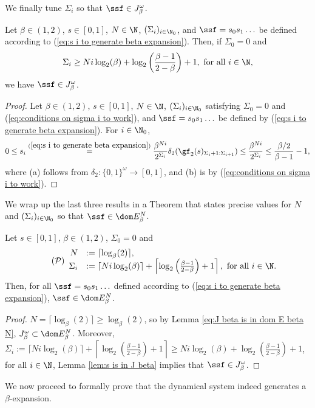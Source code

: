 \noindent We finally tune $\Sigma_i$ so that $\ssf \in J_\beta^\omega$.
\begin{lemma}\label{lem:s is in J beta}
	Let $\beta \in (1,2)$, $s \in [0,1]$, $N \in \N$, $(\Sigma_i)_{i \in \N_0}$, and $\ssf = s_0s_1\ldots$ be defined according to (\ref{eq:s i to generate beta expansion}). Then, if $\Sigma_0 = 0$ and
	\begin{equation}\label{eq:conditions on sigma i to work}
		\Sigma_i \geq Ni\log_2(\beta)+\log_2\left(\frac{\beta -1}{2 - \beta}\right) + 1, \ \text{for all} \ i \in \N,
	\end{equation}
	we have $\ssf \in J_\beta^\omega$.
\end{lemma}
\begin{proof}
	Let $\beta \in (1,2)$, $s \in [0,1]$, $N \in \N$, $(\Sigma_i)_{i \in \N_0}$ satisfying $\Sigma_0 = 0$ and (\ref{eq:conditions on sigma i to work}), and $\ssf = s_0s_1\ldots$ be defined by (\ref{eq:s i to generate beta expansion}). For $i \in \N_0$,
	\begin{equation}
		0 \leq s_i \overset{(\ref{eq:s i to generate beta expansion})}{=} \frac{\beta^{Ni}}{2^{\Sigma_i}} \delta_2(\gf_2(s)_{\Sigma_i+1:\Sigma_{i+1}}) \leq \frac{\beta^{Ni}}{2^{\Sigma_i}} \leq \frac{\beta/2}{\beta-1} - 1,
	\end{equation}
	where (a) follows from $\delta_2 : \{0,1\}^\omega \to [0,1]$, and (b) is by (\ref{eq:conditions on sigma i to work}).
\end{proof}
We wrap up the last three results in a Theorem that states precise values for $N$ and $(\Sigma_i)_{i \in \N_0}$ so that $\ssf \in \dom E_\beta^N$.
\begin{theorem}\label{thm:condition on the input sequences so that s is in dom E}
	Let $s \in [0,1]$, $\beta \in (1,2)$, $\Sigma_0 = 0$ and
	\begin{equation}\label{eq:final value parameters}\tag{\text{$\mathcal{P}$}}
		\begin{array}{rl}
			N &:= \lceil \log_\beta(2) \rceil,\\
			\Sigma_i &:= \lceil Ni\log_2(\beta)\rceil + \left\lceil \log_2\left(\frac{\beta -1}{2 - \beta}\right) + 1 \right\rceil, \ \text{for all} \ i \in \N.
		\end{array}
	\end{equation}
	Then, for all $\ssf = s_0s_1\ldots$ defined according to (\ref{eq:s i to generate beta expansion}), $\ssf \in \dom E_\beta^N$.
\end{theorem}
\begin{proof}
	$N = \lceil \log_\beta(2) \rceil \geq \log_\beta(2)$, so by Lemma \ref{eq:J beta is in dom E beta N}, $J_\beta^\omega \subset \dom E_\beta^N$. Moreover, $\Sigma_i := \lceil Ni\log_2(\beta)\rceil + \left\lceil \log_2\left(\frac{\beta -1}{2 - \beta}\right) + 1 \right\rceil \geq Ni\log_2(\beta)+\log_2\left(\frac{\beta -1}{2 - \beta}\right) + 1$, for all $i \in \N$, Lemma \ref{lem:s is in J beta} implies that $\ssf \in J_\beta^\omega$.
\end{proof}
We now proceed to formally prove that the dynamical system indeed generates a $\beta$-expansion.

